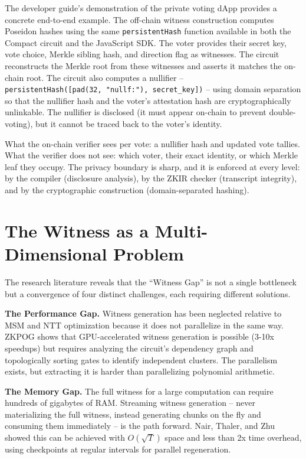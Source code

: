 \documentclass[
  11pt,
  openany]{report}
\renewcommand{\textbf}[1]{{\bfseries\color{MidnightBold}#1}}
\begin{document}
The developer guide's demonstration of the private voting dApp provides a
concrete end-to-end example. The off-chain witness construction computes
Poseidon hashes using the same \texttt{persistentHash} function available in
both the Compact circuit and the JavaScript SDK. The voter provides their secret
key, vote choice, Merkle sibling hash, and direction flag as witnesses. The
circuit reconstructs the Merkle root from these witnesses and asserts it matches
the on-chain root. The circuit also computes a nullifier --
\texttt{persistentHash({[}pad(32,\ "nullf:"),\ secret\_key{]})} -- using domain
separation so that the nullifier hash and the voter's attestation hash are
cryptographically unlinkable. The nullifier is disclosed (it must appear
on-chain to prevent double-voting), but it cannot be traced back to the voter's
identity.

What the on-chain verifier sees per vote: a nullifier hash and updated vote
tallies. What the verifier does not see: which voter, their exact identity, or
which Merkle leaf they occupy. The privacy boundary is sharp, and it is enforced
at every level: by the compiler (disclosure analysis), by the ZKIR checker
(transcript integrity), and by the cryptographic construction (domain-separated
hashing).

\section{The Witness as a Multi-Dimensional
Problem}\label{the-witness-as-a-multi-dimensional-problem}

The research literature reveals that the ``Witness Gap'' is not a single
bottleneck but a convergence of four distinct challenges, each requiring
different solutions.

\textbf{The Performance Gap.} Witness generation has been neglected relative to
MSM and NTT optimization because it does not parallelize in the same way. ZKPOG
shows that GPU-accelerated witness generation is possible (3-10x speedups) but
requires analyzing the circuit's dependency graph and topologically sorting
gates to identify independent clusters. The parallelism exists, but extracting
it is harder than parallelizing polynomial arithmetic.

\textbf{The Memory Gap.} The full witness for a large computation can require
hundreds of gigabytes of RAM. Streaming witness generation -- never
materializing the full witness, instead generating chunks on the fly and
consuming them immediately -- is the path forward. Nair, Thaler, and Zhu showed
this can be achieved with \(O(\sqrt{T})\) space and less than 2x time overhead,
using checkpoints at regular intervals for parallel regeneration.
\end{document}
